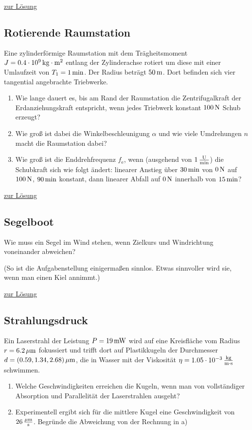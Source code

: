 \documentclass[a4paper]{scrartcl}
\begin{document}
\hyperref[lsg:Australien]{zur Lösung}

\subsection{Rotierende Raumstation}
\label{aufg:Raumstation}
Eine zylinderförmige Raumstation mit dem Trägheitsmoment $J = \unit[0.4 \cdot 10^9]{kg\cdot m^2}$ entlang der Zylinderachse rotiert um diese mit einer Umlaufzeit von $T_1 = \unit[1]{min}$. Der Radius beträgt $\unit[50]{m}$. Dort befinden sich vier tangential angebrachte Triebwerke.
\begin{enumerate}[noitemsep]
  \item Wie lange dauert es, bis am Rand der Raumstation die Zentrifugalkraft der Erdanziehungskraft entspricht, wenn jedes Triebwerk konstant $\unit[100]{N}$ Schub erzeugt?
  \item Wie groß ist dabei die Winkelbeschleunigung $\alpha$ und wie viele Umdrehungen $n$ macht die Raumstation dabei?
  \item Wie groß ist die Enddrehfrequenz $f_\text{e}$, wenn (ausgehend von $\unit[1]{\frac{U}{min}}$) die Schubkraft sich wie folgt ändert: linearer Anstieg über $\unit[30]{min}$ von $\unit[0]{N}$ auf $\unit[100]{N}$, $\unit[90]{min}$ konstant, dann linearer Abfall auf $\unit[0]{N}$ innerhalb von $\unit[15]{min}$?
\end{enumerate}

\hyperref[lsg:Raumstation]{zur Lösung}

\subsection{Segelboot}
\label{aufg:Segelboot}

Wie muss ein Segel im Wind stehen, wenn Zielkurs und Windrichtung voneinander abweichen?

(So ist die Aufgabenstellung einigermaßen sinnlos. Etwas sinnvoller wird sie, wenn man einen Kiel annimmt.)

\hyperref[lsg:Segelboot]{zur Lösung}


\subsection{Strahlungsdruck}
\label{aufg:Strahlungsdruck}
Ein Laserstrahl der Leistung $P = \unit[19]{mW}$ wird auf eine Kreisfläche vom Radius $r = \unit[6.2]{\mu m}$ fokussiert und trifft dort auf Plastikkugeln der Durchmesser $d = \unit[(0.59, 1.34, 2.68)]{\mu m}$, die in Wasser mit der Viskosität $\eta = \unit[1.05 \cdot 10^{-3}]{\frac{kg}{m\cdot s}}$ schwimmen.
\begin{enumerate}[noitemsep]
  \item Welche Geschwindigkeiten erreichen die Kugeln, wenn man von vollständiger Absorption und Parallelität der Laserstrahlen ausgeht?
  \item Experimentell ergibt sich für die mittlere Kugel eine Geschwindigkeit von $\unit[26]{\frac{\mu m}{s}}$. Begründe die Abweichung von der Rechnung in a)
\end{enumerate}
\end{document}
